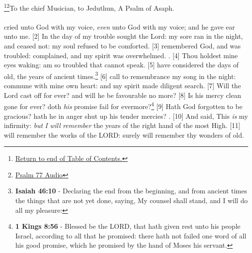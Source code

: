 \footnote{\textcolor[rgb]{0.00,0.25,0.00}{\hyperlink{TOC}{Return to end of Table of Contents.}}}\footnote{\href{https://audiobible.com/bible/psalms_77.html}{\textcolor[cmyk]{0.99998,1,0,0}{Psalm 77 Audio}}}\textcolor[cmyk]{0.99998,1,0,0}{To the chief Musician, to Jeduthun, A Psalm of Asaph.}\\
\\
\textcolor[cmyk]{0.99998,1,0,0}{ cried unto God with my voice, \emph{even} unto God with my voice; and he gave ear unto me.}
[2] \textcolor[cmyk]{0.99998,1,0,0}{In the day of my trouble  sought the Lord: my sore ran in the night, and ceased not: my soul refused to be comforted.}
[3] \textcolor[cmyk]{0.99998,1,0,0}{ remembered God, and was troubled:  complained, and my spirit was overwhelmed. .}
[4] \textcolor[cmyk]{0.99998,1,0,0}{Thou holdest mine eyes waking:  am so troubled that  cannot speak.}
[5] \textcolor[cmyk]{0.99998,1,0,0}{ have considered the days of old, the years of ancient times.}\footnote{\textbf{Isaiah 46:10} - Declaring the end from the beginning, and from ancient times the things that are not yet done, saying, My counsel shall stand, and I will do all my pleasure:}
[6] \textcolor[cmyk]{0.99998,1,0,0}{ call to remembrance my song in the night:  commune with mine own heart: and my spirit made diligent search.}
[7] \textcolor[cmyk]{0.99998,1,0,0}{Will the Lord cast off for ever? and will he be favourable no more?}
[8] \textcolor[cmyk]{0.99998,1,0,0}{Is his mercy clean gone for ever? doth \emph{his} promise fail for evermore?}\footnote{\textbf{1 Kings 8:56} - Blessed be the LORD, that hath given rest unto his people Israel, according to all that he promised: there hath not failed one word of all his good promise, which he promised by the hand of Moses his servant.}
[9] \textcolor[cmyk]{0.99998,1,0,0}{Hath God forgotten to be gracious? hath he in anger shut up his tender mercies? .}
[10] \textcolor[cmyk]{0.99998,1,0,0}{And  said, This \emph{is} my infirmity: \emph{but} \emph{I} \emph{will} \emph{remember} the years of the right hand of the most High.}
[11] \textcolor[cmyk]{0.99998,1,0,0}{ will remember the works of the LORD: surely  will remember thy wonders of old.}
